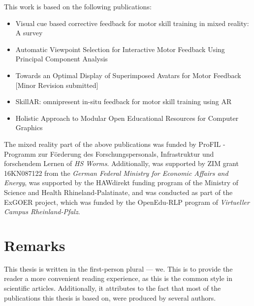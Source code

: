 This work is based on the following publications:
\begin{itemize}
	\setlength{\itemsep}{-0.3cm}
	\item Visual cue based corrective feedback for motor skill training in mixed reality: A survey \cite{diller2022vcb}
	\item Automatic Viewpoint Selection for Interactive Motor Feedback Using Principal Component Analysis \cite{diller2024automatic}
	\item Towards an Optimal Display of Superimposed Avatars for Motor Feedback [Minor Revision submitted]
	\item SkillAR: omnipresent in-situ feedback for motor skill training using AR \cite{diller2024skillar}
	\item Holistic Approach to Modular Open Educational Resources for Computer Graphics \cite{diller2024holistic}
\end{itemize}


The mixed reality part of the above publications was funded by ProFIL - Programm zur Förderung des Forschungspersonals, Infrastruktur und forschendem Lernen of \emph{HS Worms}. Additionally, \cite{diller2024automatic} was supported by ZIM grant 16KN087122 from the \emph{German Federal Ministry for Economic Affairs and Energy}, \cite{diller2024skillar} was supported by the HAWdirekt funding program of the Ministry of Science and Health Rhineland-Palatinate, and \cite{diller2024holistic} was conducted as part of the ExGOER project, which was funded by the OpenEdu-RLP program of \emph{Virtueller Campus Rheinland-Pfalz}.

\section{Remarks}

This thesis is written in the first-person plural --- we. This is to provide the reader a more convenient reading experience, as this is the common style in scientific articles. Additionally, it attributes to the fact that most of the publications this thesis is based on, were produced by several authors.